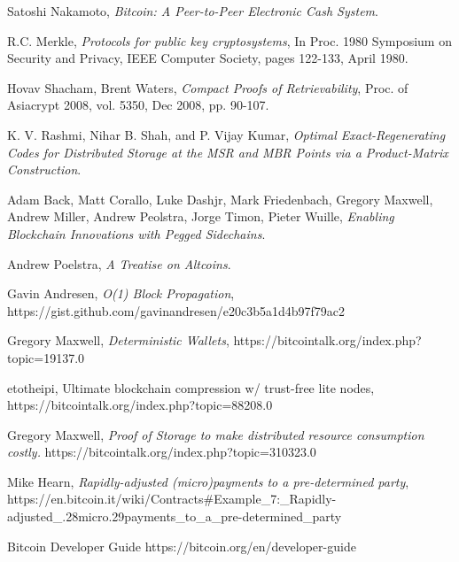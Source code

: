 \documentclass[twocolumn]{article}
\begin{document}
\onecolumn
\begin{thebibliography}{9}

	Satoshi Nakamoto,
	\emph{Bitcoin: A Peer-to-Peer Electronic Cash System}.

	R.C. Merkle,
	\emph{Protocols for public key cryptosystems},
	In Proc. 1980 Symposium on Security and	Privacy,
	IEEE Computer Society, pages 122-133, April 1980.

	Hovav Shacham, Brent Waters,
	\emph{Compact Proofs of Retrievability},
	Proc. of Asiacrypt 2008, vol. 5350, Dec 2008, pp. 90-107.

	K. V. Rashmi, Nihar B. Shah, and P. Vijay Kumar,
	\emph{Optimal Exact-Regenerating Codes for Distributed Storage at the MSR and MBR Points via a Product-Matrix Construction}.

	Adam Back, Matt Corallo, Luke Dashjr, Mark Friedenbach, Gregory Maxwell, Andrew Miller, Andrew Peolstra, Jorge Timon, Pieter Wuille,
	\emph{Enabling Blockchain Innovations with Pegged Sidechains}.

	Andrew Poelstra,
	\emph{A Treatise on Altcoins}.

	Gavin Andresen,
	\emph{O(1) Block Propagation},
	https://gist.github.com/gavinandresen/e20c3b5a1d4b97f79ac2

	Gregory Maxwell,
	\emph{Deterministic Wallets},
	https://bitcointalk.org/index.php?topic=19137.0

	etotheipi,
	Ultimate blockchain compression w/ trust-free lite nodes, \newline
	https://bitcointalk.org/index.php?topic=88208.0

	Gregory Maxwell,
	\emph{Proof of Storage to make distributed resource consumption costly.}
	https://bitcointalk.org/index.php?topic=310323.0

	Mike Hearn,
	\emph{Rapidly-adjusted (micro)payments to a pre-determined party},\newline
	https://en.bitcoin.it/wiki/Contracts\#Example\_7:\_Rapidly-adjusted\_.28micro.29payments\_to\_a\_pre-determined\_party

	Bitcoin Developer Guide
	https://bitcoin.org/en/developer-guide


\end{thebibliography}
\end{document}
